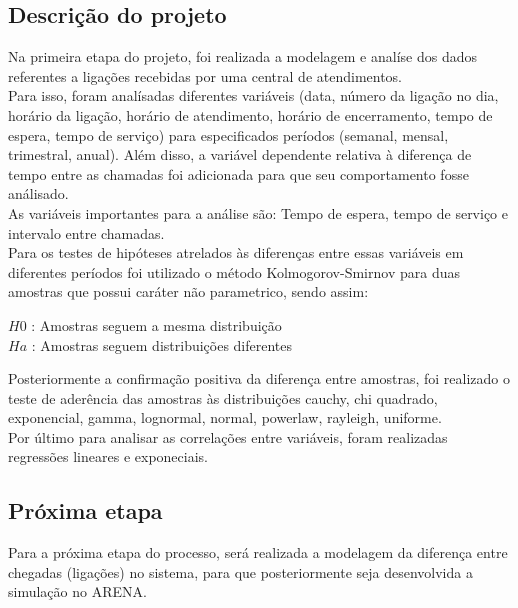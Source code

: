 \subsection{Descrição do projeto}
Na primeira etapa do projeto, foi realizada a modelagem e analíse dos dados referentes a ligações recebidas por uma central de atendimentos.\\
Para isso, foram analísadas diferentes variáveis (data, número da ligação no dia, horário da ligação, horário de atendimento, horário de encerramento, tempo de espera, tempo de serviço) para especificados períodos (semanal, mensal, trimestral, anual). Além disso, a variável dependente relativa à diferença de tempo entre as chamadas foi adicionada para que seu comportamento fosse análisado.\\
As variáveis importantes para a análise são: Tempo de espera, tempo de serviço e intervalo entre chamadas.\\
Para os testes de hipóteses atrelados às diferenças entre essas variáveis em diferentes períodos foi utilizado o método Kolmogorov-Smirnov para duas amostras que possui caráter não parametrico, sendo assim:\\
\begin{center}
$H{0}$ : Amostras seguem a mesma distribuição\\
$H{a}$ : Amostras seguem distribuições diferentes
\end{center}
Posteriormente a confirmação positiva da diferença entre amostras, foi realizado o teste de aderência das amostras às distribuições cauchy, chi quadrado, exponencial, gamma, lognormal, normal, powerlaw, rayleigh, uniforme.\\
Por último para analisar as correlações entre variáveis, foram realizadas regressões lineares e exponeciais.\\

\subsection{Próxima etapa}
Para a próxima etapa do processo, será realizada a modelagem da diferença entre chegadas (ligações) no sistema, para que posteriormente seja desenvolvida a simulação no ARENA.